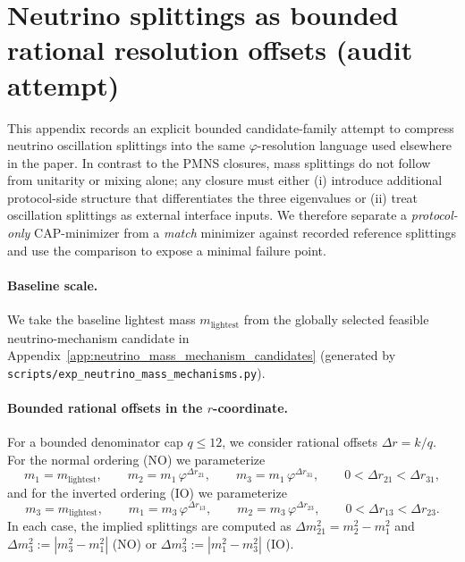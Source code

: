 \section{Neutrino splittings as bounded rational resolution offsets (audit attempt)}
\label{app:neutrino_splitting_depth_closure}

This appendix records an explicit bounded candidate-family attempt to compress neutrino oscillation splittings into the same $\varphi$-resolution language used elsewhere in the paper.
In contrast to the PMNS closures, mass splittings do not follow from unitarity or mixing alone; any closure must either (i) introduce additional protocol-side structure that differentiates the three eigenvalues or (ii) treat oscillation splittings as external interface inputs.
We therefore separate a \emph{protocol-only} CAP-minimizer from a \emph{match} minimizer against recorded reference splittings and use the comparison to expose a minimal failure point.

\paragraph{Baseline scale.}
\AuditTag We take the baseline lightest mass $m_{\mathrm{lightest}}$ from the globally selected feasible neutrino-mechanism candidate in Appendix~\ref{app:neutrino_mass_mechanism_candidates} (generated by \texttt{scripts/exp\_neutrino\_mass\_mechanisms.py}).

\paragraph{Bounded rational offsets in the $r$-coordinate.}
\AuditTag For a bounded denominator cap $q\le 12$, we consider rational offsets $\Delta r=k/q$.
For the normal ordering (NO) we parameterize
\[
m_1=m_{\mathrm{lightest}},\qquad
m_2=m_1\,\varphi^{\Delta r_{21}},\qquad
m_3=m_1\,\varphi^{\Delta r_{31}},
\qquad 0<\Delta r_{21}<\Delta r_{31},
\]
and for the inverted ordering (IO) we parameterize
\[
m_3=m_{\mathrm{lightest}},\qquad
m_1=m_3\,\varphi^{\Delta r_{13}},\qquad
m_2=m_3\,\varphi^{\Delta r_{23}},
\qquad 0<\Delta r_{13}<\Delta r_{23}.
\]
In each case, the implied splittings are computed as $\Delta m_{21}^2=m_2^2-m_1^2$ and $\Delta m_{3}^2:=|m_3^2-m_1^2|$ (NO) or $\Delta m_{3}^2:=|m_1^2-m_3^2|$ (IO).

